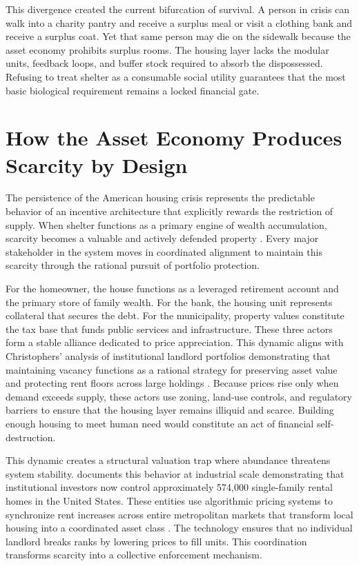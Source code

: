 \documentclass[12pt, letterpaper]{article}
\begin{document}
This divergence created the current bifurcation of survival. A person in crisis can walk into a charity pantry and receive a surplus meal or visit a clothing bank and receive a surplus coat. Yet that same person may die on the sidewalk because the asset economy prohibits surplus rooms. The housing layer lacks the modular units, feedback loops, and buffer stock required to absorb the dispossessed. Refusing to treat shelter as a consumable social utility guarantees that the most basic biological requirement remains a locked financial gate.

\section{How the Asset Economy Produces Scarcity by Design}

The persistence of the American housing crisis represents the predictable behavior of an incentive architecture that explicitly rewards the restriction of supply. When shelter functions as a primary engine of wealth accumulation, scarcity becomes a valuable and actively defended property \citep{aalbers_2016, rolnik_2019}. Every major stakeholder in the system moves in coordinated alignment to maintain this scarcity through the rational pursuit of portfolio protection.

For the homeowner, the house functions as a leveraged retirement account and the primary store of family wealth. For the bank, the housing unit represents collateral that secures the debt. For the municipality, property values constitute the tax base that funds public services and infrastructure. These three actors form a stable alliance dedicated to price appreciation. This dynamic aligns with Christophers' analysis of institutional landlord portfolios demonstrating that maintaining vacancy functions as a rational strategy for preserving asset value and protecting rent floors across large holdings \citep{christophers_2023}. Because prices rise only when demand exceeds supply, these actors use zoning, land-use controls, and regulatory barriers to ensure that the housing layer remains illiquid and scarce. Building enough housing to meet human need would constitute an act of financial self-destruction.

This dynamic creates a structural valuation trap where abundance threatens system stability. \citet{christophers_2023} documents this behavior at industrial scale demonstrating that institutional investors now control approximately 574,000 single-family rental homes in the United States. These entities use algorithmic pricing systems to synchronize rent increases across entire metropolitan markets that transform local housing into a coordinated asset class \citep{fields_2022}. The technology ensures that no individual landlord breaks ranks by lowering prices to fill units. This coordination transforms scarcity into a collective enforcement mechanism.
\end{document}
